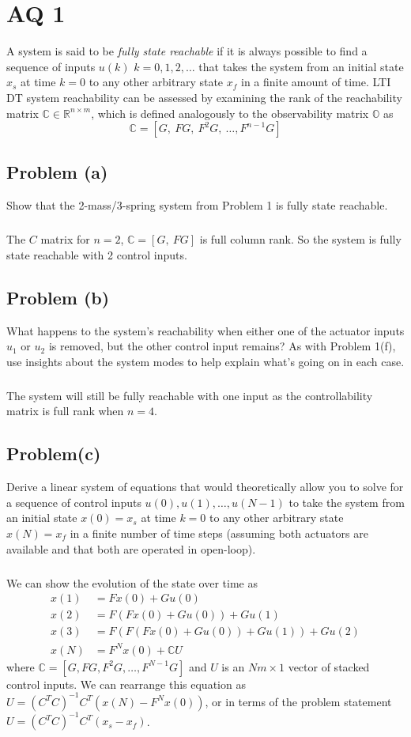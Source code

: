 \documentclass[11pt]{article}
\begin{document}
\section*{AQ 1}
A system is said to be \textit{fully state reachable} if it is always possible to find a sequence of inputs $u(k)$ $k=0,1,2,\dots$ that takes the system from an initial state $x_s$ at time $k=0$ to any other arbitrary state $x_f$ in a finite amount of time. LTI DT system reachability can be assessed by examining the rank of the reachability matrix $\mathbb{C} \in \mathbb{R}^{n\times m}$, which is defined analogously to the observability matrix $\mathbb{O}$ as 
\begin{equation*}
	\mathbb{C} = [G,\ FG,\ F^2G,\ \dots, F^{n-1}G]
\end{equation*}

\subsection*{Problem (a)}
Show that the 2-mass/3-spring system from Problem 1 is fully state reachable.

\subparagraph*{}
The $C$ matrix for $n=2$, $\mathbb{C}=[G,\ FG]$ is full column rank. So the system is fully state reachable with 2 control inputs.

\subsection*{Problem (b)}
What happens to the system's reachability when either one of the actuator inputs $u_1$ or $u_2$ is removed, but the other control input remains? As with Problem 1(f), use insights about the system modes to help explain what's going on in each case.

\subparagraph*{}
The system will still be fully reachable with one input as the controllability matrix is full rank when $n=4$. 

\subsection*{Problem(c)}
Derive a linear system of equations that would theoretically allow you to solve for a sequence of control inputs $u(0),u(1),\dots,u(N-1)$ to take the system from an initial state $x(0)=x_s$ at time $k=0$ to any other arbitrary state $x(N)=x_f$ in a finite number of time steps (assuming both actuators are available and that both are operated in open-loop).

\subparagraph*{}
We can show the evolution of the state over time as
\begin{align*}
	x(1) &= Fx(0) + Gu(0) \\
	x(2) &= F(Fx(0)+Gu(0)) + Gu(1) \\
	x(3) &= F(F(Fx(0)+Gu(0))+Gu(1)) + Gu(2) \\
	x(N) &= F^Nx(0) + \mathbb{C}U
\end{align*}
where $\mathbb{C}=[G,FG,F^2G,\dots,F^{N-1}G]$ and $U$ is an $Nm\times1$ vector of stacked control inputs. We can rearrange this equation as $U=(C^TC)^{-1}C^T(x(N)-F^Nx(0))$, or in terms of the problem statement $U=(C^TC)^{-1}C^T(x_s-x_f)$. 
\end{document}
